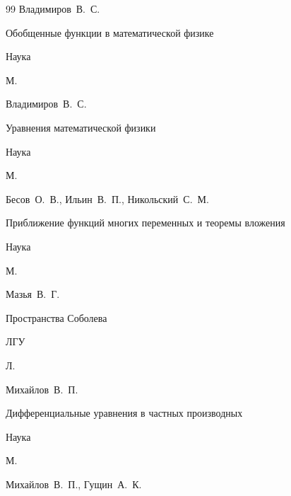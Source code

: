 \begin{thebibliography}{99}
\by Владимиров~В.~С.

\book Обобщенные функции в математической физике


\publ Наука

\publaddr М.





\by Владимиров~В.~С.

\book Уравнения математической физики


\publ Наука

\publaddr М.





\by Бесов~О.~В., Ильин~В.~П., Никольский~С.~М.

\book Приближение функций многих переменных и теоремы вложения


\publ Наука

\publaddr М.





\by Мазья~В.~Г.

\book Пространства Соболева


\publ ЛГУ

\publaddr Л.






\by Михайлов~В.~П.

\book Дифференциальные уравнения в частных производных


\publ Наука

\publaddr М.





\by Михайлов~В.~П., Гущин~А.~К.


\end{thebibliography}
